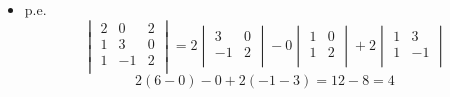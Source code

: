 \begin{itemize}
    \item p.e. \begin{equation*}
        \begin{vmatrix}
            2&0&2\\ 
            1&3&0\\
            1&-1&2\\
        \end{vmatrix} = 2 \begin{vmatrix}
            3 & 0 \\ 
            -1 & 2 \\ 
        \end{vmatrix} - 0 \begin{vmatrix}
            1 & 0 \\ 
            1 & 2 \\ 
        \end{vmatrix} + 2 \begin{vmatrix}
            1 & 3 \\ 
            1 & -1 \\ 
        \end{vmatrix}
    \end{equation*}
    \[
      2(6-0)-0 + 2(-1-3) = 12 - 8 = 4 
    \]


\end{itemize}


